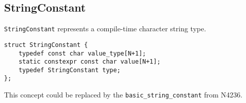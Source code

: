 \subsection{StringConstant}
\label{concept-StringConstant}

\texttt{StringConstant} represents a compile-time character string type. 

\begin{verbatim}
struct StringConstant {
	typedef const char value_type[N+1];
	static constexpr const char value[N+1];
	typedef StringConstant type;
};
\end{verbatim}

This concept could be replaced by the \texttt{basic\_string\_constant}
from N4236.
